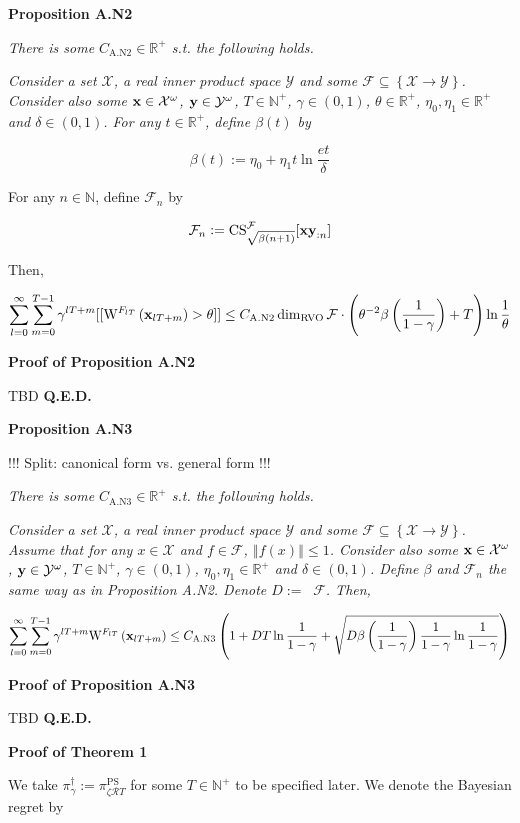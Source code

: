 \documentclass[a4paper]{article}
\newcommand{\Co}[1]{}
\newcommand{\AP}[1]{\left(#1\right)}
\newcommand{\AC}[1]{\left\{#1\right\}}
\newcommand{\Nats}{\mathbb{N}}
\newcommand{\Reals}{\mathbb{R}}
\newcommand{\Norm}[1]{\left\Vert #1 \right\Vert}
\newcommand{\X}{\mathcal{X}}
\newcommand{\Y}{\mathcal{Y}}
\newcommand{\F}{\mathcal{F}}
\newcommand{\R}{\mathcal{R}}
\DeclareMathOperator{\RVO}{\dim_{RVO}}
\newcommand{\PSR}{\text{PS}}
\newcommand{\CS}{\mathrm{CS}}
\newcommand{\W}{\mathrm{W}}
\begin{document}
\textbf{Proposition A.N2}\Co{b}

\textit{There is some $C_{\mathrm{A.N2}}\in\Reals^+$ s.t. the following holds.}\Co{i}

\textit{Consider a set $\X$, a real inner product space $\Y$ and some $\F\subseteq\AC{\X\rightarrow\Y}$. Consider also some $\bold{x}\in\X^\omega$, $\bold{y}\in\Y^\omega$, $T\in\Nats^+$, $\gamma\in(0,1)$, $\theta\in\Reals^+$, $\eta_0,\eta_1\in\Reals^+$ and $\delta\in(0,1)$. For any $t\in\Reals^+$, define $\beta(t)$ by}\Co{i}

$$\beta(t):=\eta_0 + \eta_1t\ln{\frac{et}{\delta}}$$

For any $n\in\Nats$, define $\F_n$ by

$$\F_n:=\CS^\F_{\sqrt{\beta(n+1)}}[\bold{xy}_{:n}]$$

Then,

$$\sum_{l=0}^\infty\sum_{m=0}^{T-1}{\gamma^{lT+m}[[\W^{F_{lT}}\AP{\bold{x}_{lT+m}}>\theta]]} \leq C_{\mathrm{A.N2}}\RVO{\F}\cdot\AP{\theta^{-2}\beta\AP{\frac{1}{1-\gamma}}+T}\ln{\frac{1}{\theta}}$$

\textbf{Proof of Proposition A.N2}\Co{b}

TBD \textbf{Q.E.D.}\Co{b}

\textbf{Proposition A.N3}\Co{b}

!!! Split: canonical form vs. general form !!!

\textit{There is some $C_{\mathrm{A.N3}}\in\Reals^+$ s.t. the following holds.}\Co{i}

\textit{Consider a set $\X$, a real inner product space $\Y$ and some $\F\subseteq\AC{\X\rightarrow\Y}$. Assume that for any $x\in\X$ and $f\in\F$, $\Norm{f(x)}\leq 1$. Consider also some $\bold{x}\in\X^\omega$, $\bold{y}\in\Y^\omega$, $T\in\Nats^+$, $\gamma\in(0,1)$, $\eta_0,\eta_1\in\Reals^+$ and $\delta\in(0,1)$. Define $\beta$ and $\F_n$ the same way as in Proposition A.N2. Denote $D:=\RVO{\F}$. Then,}\Co{i}

$$\sum_{l=0}^\infty\sum_{m=0}^{T-1}{\gamma^{lT+m}\W^{F_{lT}}\AP{\bold{x}_{lT+m}}} \leq C_{\mathrm{A.N3}}\AP{1+D T\ln\frac{1}{1-\gamma}+\sqrt{D\beta\AP{\frac{1}{1-\gamma}}\frac{1}{1-\gamma}\ln{\frac{1}{1-\gamma}}}}$$

\textbf{Proof of Proposition A.N3}\Co{b}

TBD \textbf{Q.E.D.}\Co{b}

\textbf{Proof of Theorem 1}\Co{b}

We take $\pi^\dagger_\gamma:=\pi^\PSR_{\zeta\R T}$ for some $T\in\Nats^+$ to be specified later. We denote the Bayesian regret by
\end{document}
